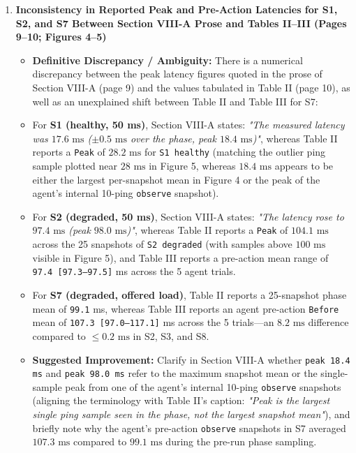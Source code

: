 \documentclass[11pt,a4paper]{article}
\begin{document}
\begin{enumerate}[leftmargin=1.6em,itemsep=3pt]
\item \textbf{Inconsistency in Reported Peak and Pre-Action Latencies for S1, S2, and S7 Between Section VIII-A Prose and Tables II–III (Pages 9–10; Figures 4–5)}
\begin{itemize}[leftmargin=1.8em,itemsep=2pt]
\item \textbf{Definitive Discrepancy / Ambiguity:} There is a numerical discrepancy between the peak latency figures quoted in the prose of Section VIII-A (page 9) and the values tabulated in Table II (page 10), as well as an unexplained shift between Table II and Table III for S7:
\item For \textbf{S1 (healthy, 50 ms)}, Section VIII-A states: \emph{"The measured latency was $17.6\text{ ms}$ ($\pm 0.5\text{ ms}$ over the phase, peak $18.4\text{ ms}$)"}, whereas Table II reports a \texttt{Peak} of \textbf{$28.2\text{ ms}$} for \texttt{S1 healthy} (matching the outlier ping sample plotted near $28\text{ ms}$ in Figure 5, whereas $18.4\text{ ms}$ appears to be either the largest per-snapshot mean in Figure 4 or the peak of the agent's internal 10-ping \texttt{observe} snapshot).
\item For \textbf{S2 (degraded, 50 ms)}, Section VIII-A states: \emph{"The latency rose to $97.4\text{ ms}$ (peak $98.0\text{ ms}$)"}, whereas Table II reports a \texttt{Peak} of \textbf{$104.1\text{ ms}$} across the 25 snapshots of \texttt{S2 degraded} (with samples above $100\text{ ms}$ visible in Figure 5), and Table III reports a pre-action mean range of \texttt{97.4 [97.3–97.5]} ms across the 5 agent trials.
\item For \textbf{S7 (degraded, offered load)}, Table II reports a 25-snapshot phase mean of \texttt{99.1} ms, whereas Table III reports an agent pre-action \texttt{Before} mean of \texttt{107.3 [97.0–117.1]} ms across the 5 trials—an $8.2\text{ ms}$ difference compared to $\le 0.2\text{ ms}$ in S2, S3, and S8.
\item \textbf{Suggested Improvement:} Clarify in Section VIII-A whether \texttt{peak 18.4 ms} and \texttt{peak 98.0 ms} refer to the maximum snapshot mean or the single-sample peak from one of the agent's internal 10-ping \texttt{observe} snapshots (aligning the terminology with Table II's caption: \emph{"Peak is the largest single ping sample seen in the phase, not the largest snapshot mean"}), and briefly note why the agent's pre-action \texttt{observe} snapshots in S7 averaged $107.3\text{ ms}$ compared to $99.1\text{ ms}$ during the pre-run phase sampling.
\end{itemize}
\end{enumerate}
\end{document}
